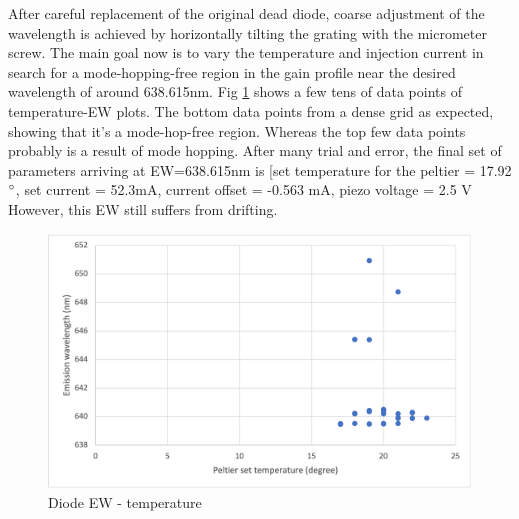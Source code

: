 \documentclass[12pt]{report}
\begin{document}
After careful replacement of the original dead diode, coarse adjustment of the wavelength is achieved by horizontally tilting the grating with the micrometer screw. The main goal now is to vary the temperature and injection current in search for a mode-hopping-free region in the gain profile near the desired wavelength of around 638.615nm. Fig \ref{fig:diodeLaserEW} shows a few tens of data points of temperature-EW plots. The bottom data points from a dense grid as expected, showing that it's a mode-hop-free region. Whereas the top few data points probably is a result of mode hopping. After many trial and error, the final set of parameters arriving at EW=638.615nm is [set temperature for the peltier = 17.92$\degree$, set current = 52.3mA, current offset = -0.563 mA, piezo voltage = 2.5 V However, this EW still suffers from drifting. 

\begin{figure}[H]
    \centering
    \includegraphics{diodeLaserEW.png}
    \caption{Diode EW - temperature}
    \label{fig:diodeLaserEW}
\end{figure}
\end{document}
